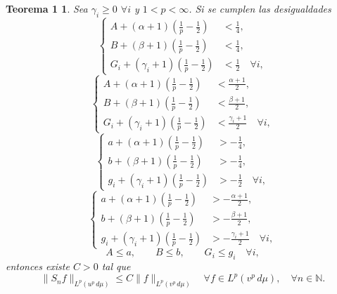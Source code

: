 \documentclass[a4paper,12pt]{article}
\theoremstyle{plain}
\newtheorem*{theoremOne}{Teorema 1}
\theoremstyle{definition}
\newcommand{\N}{\mathbb{N}}
\begin{document}
\begin{theoremOne}
Sea $\gamma_{i} \geq 0$ $\forall i$ y $1 < p < \infty$.
Si se cumplen las desigualdades
\begin{equation}
\left\{
\begin{aligned}
A + (\alpha+1) \left(\frac{1}{p} - \frac{1}{2}\right) &< \frac{1}{4}, \\
B + (\beta+1) \left(\frac{1}{p} - \frac{1}{2}\right) &< \frac{1}{4}, \\
G_{i} + (\gamma_{i}+1) \left(\frac{1}{p} - \frac{1}{2}\right) &< \frac{1}{2}
\quad \forall i,
\end{aligned}
\right.
\tag{2}
\end{equation}
\begin{equation}
\left\{
\begin{aligned}
A + (\alpha+1) \left(\frac{1}{p} - \frac{1}{2}\right) &< \frac{\alpha+1}{2}, \\
B + (\beta+1) \left(\frac{1}{p} - \frac{1}{2}\right) &< \frac{\beta+1}{2}, \\
G_{i} + (\gamma_{i}+1) \left(\frac{1}{p} - \frac{1}{2}\right) &< \frac{\gamma_{i}+1}{2}
\quad \forall i,
\end{aligned}
\right.
\tag{3}
\end{equation}
\begin{equation}
\left\{
\begin{aligned}
a + (\alpha+1) \left(\frac{1}{p} - \frac{1}{2}\right) &> - \frac{1}{4}, \\
b + (\beta+1) \left(\frac{1}{p} - \frac{1}{2}\right) &> - \frac{1}{4}, \\
g_{i} + (\gamma_{i}+1) \left(\frac{1}{p} - \frac{1}{2}\right) &> - \frac{1}{2}
\quad \forall i,
\end{aligned}
\right.
\tag{4}
\end{equation}
\begin{equation}
\left\{
\begin{aligned}
a + (\alpha+1) \left(\frac{1}{p} - \frac{1}{2}\right) &> - \frac{\alpha+1}{2}, \\
b + (\beta+1) \left(\frac{1}{p} - \frac{1}{2}\right) &> - \frac{\beta+1}{2}, \\
g_{i} + (\gamma_{i}+1) \left(\frac{1}{p} - \frac{1}{2}\right) &> - \frac{\gamma_{i}+1}{2}
\quad \forall i,
\end{aligned}
\right.
\tag{5}
\end{equation}
\begin{equation}
A \leq a, \qquad B \leq b, \qquad G_{i} \leq g_{i}
\quad \forall i,
\tag{6}
\end{equation}
entonces existe $C > 0$ tal que
$$
\| S_{n}f \|_{L^{p}(u^{p}\,d\mu)}
\leq C \| f \|_{L^{p}(v^{p}\,d\mu)}
\quad \forall f \in L^{p}(v^{p}\,d\mu),
\quad \forall n \in \N.
$$
\end{theoremOne}
\end{document}
